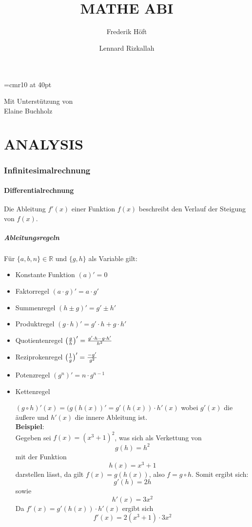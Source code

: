 \documentclass[a4paper,12pt]{article}
\begin{document}
\author{
	Frederik Höft\\
	\and
	Lennard Rizkallah\\
}
\font\titlefont=cmr10 at 40pt
\title{{\titlefont MATHE ABI}}
\maketitle
\begin{center}
Mit Unterstützung von\\
\large{Elaine Buchholz}
\end{center}
\pagebreak
\tableofcontents{}
\pagebreak
\part{ANALYSIS}
\section{Infinitesimalrechnung}
\subsection{Differentialrechnung}
Die Ableitung $f'(x)$ einer Funktion $f(x)$ beschreibt den Verlauf der Steigung von $f(x)$.
\subsubsection{Ableitungsregeln}
Für $\{a,b,n\} \in \mathbb{R}$ und $\{g,h\}$ als Variable gilt:
\begin{itemize}
\item Konstante Funktion
	\subitem $(a)' = 0$
\item Faktorregel
	\subitem $(a \cdot g)' = a \cdot g'$
\item Summenregel
	\subitem $(h \pm g)' = g' \pm h'$
\item Produktregel
	\subitem $(g \cdot h)' = g' \cdot h + g \cdot h'$
\item Quotientenregel
	\subitem $\big{(}\frac{g}{h}\big{)}' = \frac{g' \cdot h - g \cdot h'}{h^2}$
\item Reziprokenregel
	\subitem $\big{(}\frac{1}{g}\big{)}' = \frac{-g'}{g^2}$
\item Potenzregel
	\subitem $(g^n)' = n \cdot g^{n-1}$
\pagebreak
\item Kettenregel
	\subitem \parbox[t]{\linewidth}{$(g \circ h)'(x) = (g(h(x))' = g'(h(x)) \cdot h'(x)$
		wobei $g'(x)$ die äußere und $h'(x)$ die innere Ableitung ist.\\
		\textbf{Beispiel}:\\
		Gegeben sei $f(x) = (x^3 + 1)^2$, was sich als Verkettung von
		$$g(h) = h^2$$
		mit der Funktion
		$$h(x) = x^3 + 1$$
		darstellen lässt, da gilt $f(x) = g(h(x))$, also $f = g \circ h$. Somit ergibt sich:
		$$g'(h) = 2h$$
		sowie
		$$h'(x) = 3x^2$$
		Da $f'(x) = g'(h(x)) \cdot h'(x)$ ergibt sich
		$$f'(x) = 2(x^3 + 1) \cdot 3x^2$$}
\end{itemize}
\pagebreak
\end{document}
